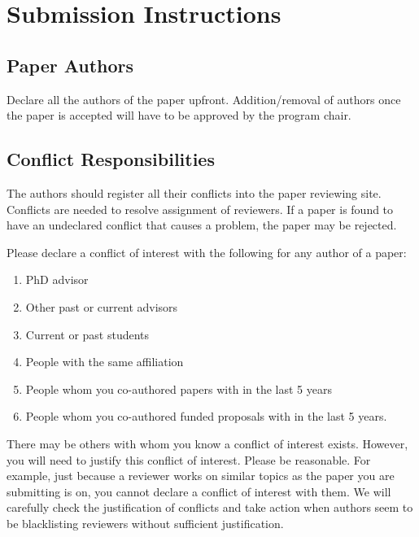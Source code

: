 


\section{Submission Instructions}

\subsection{Paper Authors}

Declare all the authors of the paper upfront. Addition/removal of authors once
the paper is accepted will have to be approved by the program chair.

\subsection{Conflict Responsibilities}

The authors should register all their conflicts into the paper reviewing site.
Conflicts are needed to resolve assignment of reviewers. If a paper is found to
have an undeclared conflict that causes a problem, the paper may be rejected.

Please declare a conflict of interest with the following for any author of a paper:

\begin{enumerate}
\item PhD advisor
\item Other past or current advisors
\item Current or past students
\item People with the same affiliation
\item People whom you co-authored papers with in the last 5 years
\item People whom you co-authored funded proposals with in the last 5 years.
\end{enumerate}

There may be others with whom you know a conflict of interest exists.  However,
you will need to justify this conflict of interest.  Please be reasonable.  For
example, just because a reviewer works on similar topics as the paper you are
submitting is on, you cannot declare a conflict of interest with
them. We will carefully check the justification of conflicts and take
action when authors seem to be blacklisting reviewers without
sufficient justification. 

